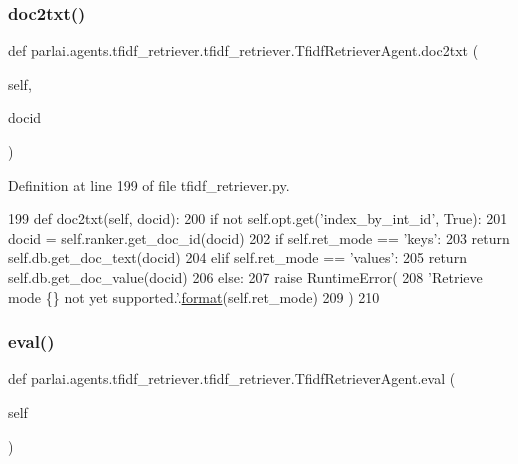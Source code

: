 \subsubsection{\texorpdfstring{doc2txt()}{doc2txt()}}
{\footnotesize\ttfamily def parlai.\+agents.\+tfidf\+\_\+retriever.\+tfidf\+\_\+retriever.\+Tfidf\+Retriever\+Agent.\+doc2txt (\begin{DoxyParamCaption}\item[{}]{self,  }\item[{}]{docid }\end{DoxyParamCaption})}



Definition at line 199 of file tfidf\+\_\+retriever.\+py.


\begin{DoxyCode}
199     \textcolor{keyword}{def }doc2txt(self, docid):
200         \textcolor{keywordflow}{if} \textcolor{keywordflow}{not} self.opt.get(\textcolor{stringliteral}{'index\_by\_int\_id'}, \textcolor{keyword}{True}):
201             docid = self.ranker.get\_doc\_id(docid)
202         \textcolor{keywordflow}{if} self.ret\_mode == \textcolor{stringliteral}{'keys'}:
203             \textcolor{keywordflow}{return} self.db.get\_doc\_text(docid)
204         \textcolor{keywordflow}{elif} self.ret\_mode == \textcolor{stringliteral}{'values'}:
205             \textcolor{keywordflow}{return} self.db.get\_doc\_value(docid)
206         \textcolor{keywordflow}{else}:
207             \textcolor{keywordflow}{raise} RuntimeError(
208                 \textcolor{stringliteral}{'Retrieve mode \{\} not yet supported.'}.\hyperlink{namespaceparlai_1_1chat__service_1_1services_1_1messenger_1_1shared__utils_a32e2e2022b824fbaf80c747160b52a76}{format}(self.ret\_mode)
209             )
210 
\end{DoxyCode}
\mbox{\label{classparlai_1_1agents_1_1tfidf__retriever_1_1tfidf__retriever_1_1TfidfRetrieverAgent_a97a3e0824539ff7df230ccaee5cdda20}} 
\subsubsection{\texorpdfstring{eval()}{eval()}}
{\footnotesize\ttfamily def parlai.\+agents.\+tfidf\+\_\+retriever.\+tfidf\+\_\+retriever.\+Tfidf\+Retriever\+Agent.\+eval (\begin{DoxyParamCaption}\item[{}]{self }\end{DoxyParamCaption})}



